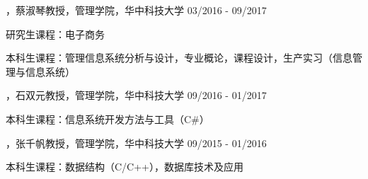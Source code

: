 
\begin{cventries}

\cvexperience
{，蔡淑琴教授，管理学院，华中科技大学}
{03/2016 - 09/2017}
{
    \begin{cvitems}
    \item {研究生课程：电子商务}
    \item {本科生课程：管理信息系统分析与设计，专业概论，课程设计，生产实习（信息管理与信息系统）}
    \end{cvitems}
}

\cvexperience
{，石双元教授，管理学院，华中科技大学}
{09/2016 - 01/2017}
{
    \begin{cvitems}
    \item {本科生课程：信息系统开发方法与工具（C\#）}
    \end{cvitems}
}

\cvexperience
{，张千帆教授，管理学院，华中科技大学}
{09/2015 - 01/2016}
{
    \begin{cvitems}
    \item {本科生课程：数据结构（C/C++），数据库技术及应用}
    \end{cvitems}
}

\end{cventries}